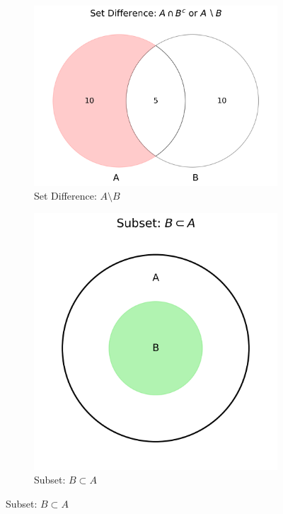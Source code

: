 \begin{figure}[h]
    \begin{subfigure}{0.48\textwidth}
        \includegraphics[width=\textwidth]{figures/set_operations/difference.png}
        \caption{Set Difference: $A \setminus B$}
        \label{fig:difference}
    \end{subfigure}
    \hfill
    \begin{subfigure}{0.48\textwidth}
        \includegraphics[width=\textwidth]{figures/set_operations/subset.png}
        \caption{Subset: $B \subset A$}
        \label{fig:subset}
    \end{subfigure}
    

\end{figure}
